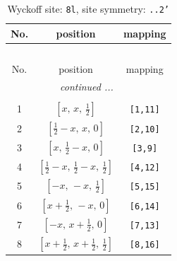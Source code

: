 \documentclass[fleqn,8pt]{jsarticle}
\begin{document}
\begin{longtable}{ccc}
\caption{Wyckoff site: {\tt 8l}, site symmetry: {\tt ..2'}}
 \\
 \hline \hline
No. & position & mapping \\ \hline \endfirsthead

\multicolumn{2}{l}{\tablename\ \thetable{}} \\
 \hline \hline
No. & position & mapping \\ \hline \endhead

 \hline \hline
\multicolumn{2}{r}{\footnotesize\it continued ...} \\ \endfoot

 \hline \hline
\multicolumn{2}{r}{} \\ \endlastfoot

1 & $\left[ x,\, x,\, \frac{1}{2} \right]$ & {\tt [1,11]} \\ \hline
2 & $\left[ \frac{1}{2} - x,\, x,\, 0 \right]$ & {\tt [2,10]} \\ \hline
3 & $\left[ x,\, \frac{1}{2} - x,\, 0 \right]$ & {\tt [3,9]} \\ \hline
4 & $\left[ \frac{1}{2} - x,\, \frac{1}{2} - x,\, \frac{1}{2} \right]$ & {\tt [4,12]} \\ \hline
5 & $\left[ - x,\, - x,\, \frac{1}{2} \right]$ & {\tt [5,15]} \\ \hline
6 & $\left[ x + \frac{1}{2},\, - x,\, 0 \right]$ & {\tt [6,14]} \\ \hline
7 & $\left[ - x,\, x + \frac{1}{2},\, 0 \right]$ & {\tt [7,13]} \\ \hline
8 & $\left[ x + \frac{1}{2},\, x + \frac{1}{2},\, \frac{1}{2} \right]$ & {\tt [8,16]} \\
\end{longtable}
\renewcommand{\arraystretch}{1.2}
\end{document}
